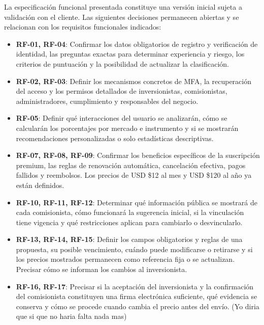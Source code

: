 \documentclass[11pt,a4paper,oneside]{article}
\begin{document}
La especificación funcional presentada constituye una versión inicial sujeta a validación con el cliente. Las siguientes decisiones permanecen abiertas y se relacionan con los requisitos funcionales indicados:


\begin{itemize}

    \item \textbf{RF-01, RF-04}: Confirmar los datos obligatorios de registro y verificación de identidad, las preguntas exactas para determinar experiencia y riesgo, los criterios de puntuación y la posibilidad de actualizar la clasificación.

    \item \textbf{RF-02, RF-03}: Definir los mecanismos concretos de MFA, la recuperación del acceso y los permisos detallados de inversionistas, comisionistas, administradores, cumplimiento y responsables del negocio.

    \item \textbf{RF-05}: Definir qué interacciones del usuario se analizarán, cómo se calcularán los porcentajes por mercado e instrumento y si se mostrarán recomendaciones personalizadas o solo estadísticas descriptivas.

    \item \textbf{RF-07, RF-08, RF-09}: Confirmar los beneficios específicos de la suscripción premium, las reglas de renovación automática, cancelación efectiva, pagos fallidos y reembolsos. Los precios de USD \$12 al mes y USD \$120 al año ya están definidos.

    \item \textbf{RF-10, RF-11, RF-12}: Determinar qué información pública se mostrará de cada comisionista, cómo funcionará la sugerencia inicial, si la vinculación tiene vigencia y qué restricciones aplican para cambiarlo o desvincularlo.

    \item \textbf{RF-13, RF-14, RF-15}: Definir los campos obligatorios y reglas de una propuesta, su posible vencimiento, cuándo puede modificarse o retirarse y si los precios mostrados permanecen como referencia fija o se actualizan. Precisar cómo se informan los cambios al inversionista.

    \item \textbf{RF-16, RF-17}: Precisar si la aceptación del inversionista y la confirmación del comisionista constituyen una firma electrónica suficiente, qué evidencia se conserva y cómo se procede cuando cambia el precio antes del envío. (Yo diria que si que no haria falta nada mas)


\end{itemize}
\end{document}

